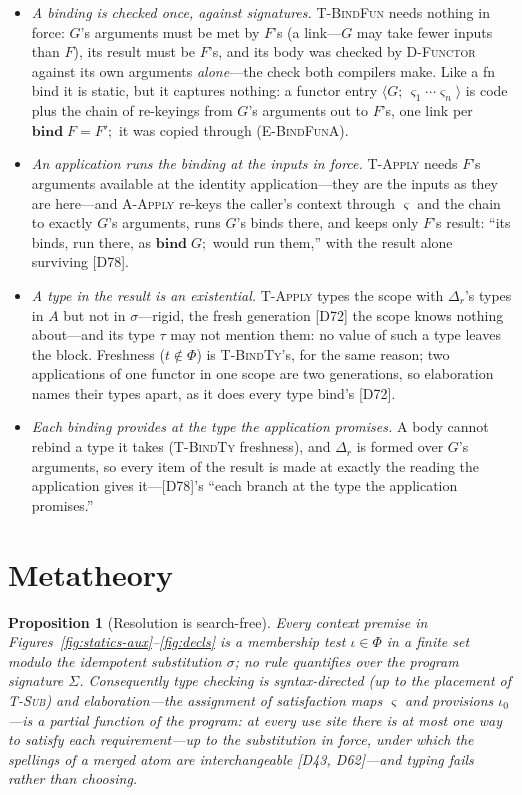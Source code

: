 \documentclass[10pt]{article}
\newcommand{\kw}[1]{\mathbf{#1}}          %
\theoremstyle{plain}
\newtheorem{proposition}[theorem]{Proposition}
\theoremstyle{remark}
\begin{document}
\begin{itemize}
\item \emph{A binding is checked once, against signatures.}
\textsc{T-BindFun} needs nothing in force: $G$'s arguments must be met by
$F$'s (a link---$G$ may take fewer inputs than $F$), its result must be
$F$'s, and its body was checked by \textsc{D-Functor} against its own
arguments \emph{alone}---the check both compilers make. Like a fn bind it
is static, but it captures nothing: a functor entry
$\langle G;\, \varsigma_1 \cdots \varsigma_n \rangle$ is code plus the
chain of re-keyings from $G$'s arguments out to $F$'s, one link per
$\kw{bind}\;F = F';$ it was copied through (\textsc{E-BindFunA}).
\item \emph{An application runs the binding at the inputs in force.}
\textsc{T-Apply} needs $F$'s arguments available at the identity
application---they are the inputs as they are here---and
\textsc{A-Apply} re-keys the caller's context through $\varsigma$ and the
chain to exactly $G$'s arguments, runs $G$'s binds there, and keeps only
$F$'s result: ``its binds, run there, as $\kw{bind}\;G;$ would run them,''
with the result alone surviving [D78].
\item \emph{A type in the result is an existential.} \textsc{T-Apply}
types the scope with $\Delta_r$'s types in $A$ but not in $\sigma$---rigid,
the fresh generation [D72] the scope knows nothing about---and its type
$\tau$ may not mention them: no value of such a type leaves the block.
Freshness ($t \notin \Phi$) is \textsc{T-BindTy}'s, for the same reason;
two applications of one functor in one scope are two generations, so
elaboration names their types apart, as it does every type bind's [D72].
\item \emph{Each binding provides at the type the application promises.}
A body cannot rebind a type it takes (\textsc{T-BindTy} freshness), and
$\Delta_r$ is formed over $G$'s arguments, so every item of the result is
made at exactly the reading the application gives it---[D78]'s ``each
branch at the type the application promises.''
\end{itemize}

\section{Metatheory}\label{sec:meta}

\begin{proposition}[Resolution is search-free]\label{prop:nosearch}
Every context premise in Figures~\ref{fig:statics-aux}--\ref{fig:decls}
is a membership test $\iota \in \Phi$ in a finite set modulo the
idempotent substitution $\sigma$; no rule quantifies over the program
signature $\Sigma$. Consequently type checking is syntax-directed (up to
the placement of \textsc{T-Sub}) and elaboration---the assignment of
satisfaction maps $\varsigma$ and provisions $\iota_0$---is a partial
function of the program: at every use site there is at most one way to
satisfy each requirement---up to the substitution in force, under which
the spellings of a merged atom are interchangeable [D43, D62]---and typing
fails rather than choosing.
\end{proposition}
\end{document}
